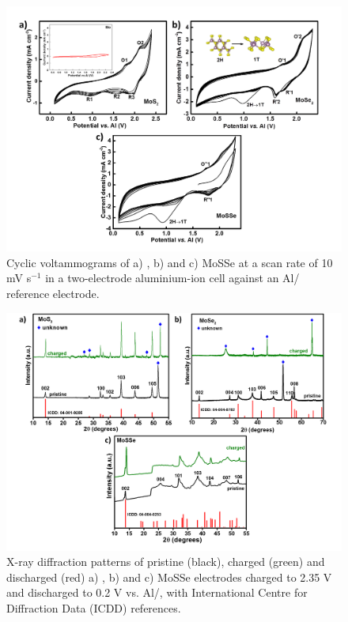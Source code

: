 \begin{figure}
  \centering
  \includegraphics[width=\textwidth]{Figures/chap4fig/fig2}
  \caption{Cyclic voltammograms of a) , b)  and c) MoSSe at a scan rate of 10 mV s$^{-1}$ in a two-electrode aluminium-ion cell against an Al/ reference electrode.}
  \label{Figures/chap4fig:fig2}
\end{figure} 

\begin{figure}
  \centering
  \includegraphics[width=\textwidth]{Figures/chap4fig/fig3}
  \caption{X-ray diffraction patterns of pristine (black), charged (green) and discharged (red) a) , b)  and c) MoSSe electrodes charged to 2.35 V and discharged to 0.2 V vs. Al/, with International Centre for Diffraction Data (ICDD) references.}
  \label{Figures/chap4fig:fig3}
\end{figure}

